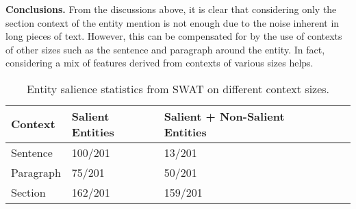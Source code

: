 \documentclass[sigconf,authordraft]{acmart}
\begin{document}

\textbf{Conclusions.} From the discussions above, it is clear that considering only the section context of the entity mention is not enough due to the noise inherent in long pieces of text. However, this can be compensated for by the use of contexts of other sizes such as the sentence and paragraph around the entity. In fact, considering a mix of features derived from contexts of various sizes helps.

\begin{table}[t]
    \caption{Entity salience statistics from SWAT on different context sizes.}
    \label{tab:Results-Entity Salience-Stats}
    \begin{tabular}{@{}lllll@{}}
        \toprule
        Context & 
        Salient Entities & 
        Salient + Non-Salient Entities
        \\

        \midrule
        
         Sentence & 
         100/201 &  
         13/201
         \\
         
         Paragraph & 
         75/201 &  
         50/201 
         \\
         
         Section & 
         162/201 &  
         159/201 
         \\

        
          \bottomrule
    \end{tabular}
\end{table}
\end{document}
